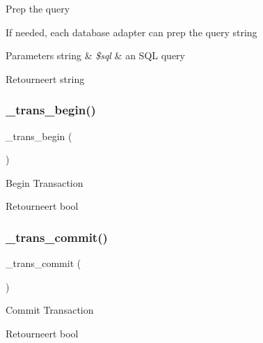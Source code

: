 Prep the query

If needed, each database adapter can prep the query string


\begin{DoxyParams}[1]{Parameters}
string & {\em \$sql} & an S\+QL query \\
\hline
\end{DoxyParams}
\begin{DoxyReturn}{Retourneert}
string 
\end{DoxyReturn}
\mbox{\label{class_c_i___d_b__mysql__driver_ac81ac882c1d54347d810199a15856aac}} 
\subsubsection{\texorpdfstring{\_trans\_begin()}{\_trans\_begin()}}
{\footnotesize\ttfamily \+\_\+trans\+\_\+begin (\begin{DoxyParamCaption}{ }\end{DoxyParamCaption})\hspace{0.3cm}{\ttfamily [protected]}}

Begin Transaction

\begin{DoxyReturn}{Retourneert}
bool 
\end{DoxyReturn}
\mbox{\label{class_c_i___d_b__mysql__driver_a6fe7f373e0b11cfae23a5f41c0b35dda}} 
\subsubsection{\texorpdfstring{\_trans\_commit()}{\_trans\_commit()}}
{\footnotesize\ttfamily \+\_\+trans\+\_\+commit (\begin{DoxyParamCaption}{ }\end{DoxyParamCaption})\hspace{0.3cm}{\ttfamily [protected]}}

Commit Transaction

\begin{DoxyReturn}{Retourneert}
bool 
\end{DoxyReturn}
\mbox{\label{class_c_i___d_b__mysql__driver_ad49a116b0776c26b53114c9093fd102a}} 
